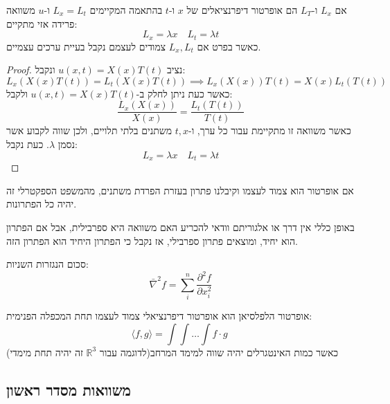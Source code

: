 \documentclass{tstextbook}
\begin{document}
\begin{proposition}
אם \(L_{x}\) ו-\(L_{T}\) הם אופרטור דיפרנציאלים של \(x\) ו-\(t\) בהתאמה המקיימים \(L_{x}=L_{t}\) ו-\(u\) משוואה פרידה אזי מתקיים:
$$L_{x}=\lambda x\quad L_{t}=\lambda t$$
כאשר בפרט אם \(L_{x},L_{t}\) צמודים לעצמם נקבל בעיית ערכים עצמיים.

\end{proposition}
\begin{proof}
נציב \(u(x,t)=X(x)T(t)\) ונקבל:
$$L_{x}(X(x)T(t))=L_{t}(X(x)T(t))\implies L_{x}(X(x))T(t)=X(x)L_{t}(T(t))$$
כאשר כעת ניתן לחלק ב-\(u(x,t)=X(x)T(t)\) ולקבל:
$$\frac{L_{x}(X(x))}{X(x)}=\frac{L_{t}(T(t))}{T(t)}$$
כאשר משוואה זו מתקיימת עבור כל ערך, ו-\(t,x\) משתנים בלתי תלויים, ולכן שווה לקבוע אשר נסמן \(\lambda\). כעת נקבל:
$$L_{x}=\lambda x\quad L_{t}=\lambda t$$

\end{proof}
\begin{corollary}
אם אופרטור הוא צמוד לעצמו וקיבלנו פתרון בעזרת הפרדת משתנים, מהמשפט הספקטרלי זה יהיה כל הפתרונות.

\end{corollary}
\begin{remark}
באופן כללי אין דרך או אלגוריתם וודאי להכריע האם משוואה היא ספרבילית, אבל אם הפתרון הוא יחיד, ומוצאים פתרון ספרבילי, אז נקבל כי הפתרון היחיד הוא הפתרון הזה.

\end{remark}
\begin{definition}[לפלאסיאן]
סכום הנגזרות השניות:
$$\bar{\nabla}^2 f=\sum_{i}^{n}\frac{\partial^{2} f}{\partial x_{i}^{2}} $$

\end{definition}
\begin{proposition}
אופרטור הלפלסיאן הוא אופרטור דיפרנציאלי צמוד לעצמו תחת המכפלה הפנימית:
$$\langle f,g \rangle = \int\int \dots \int f\cdot g\;$$
כאשר כמות האינטגרלים יהיה שווה למימד המרחב(לדוגמה עבור \(\mathbb{R}^{3}\) זה יהיה תחת מימדי)

\end{proposition}
\subsection{משוואות מסדר ראשון}
\end{document}
